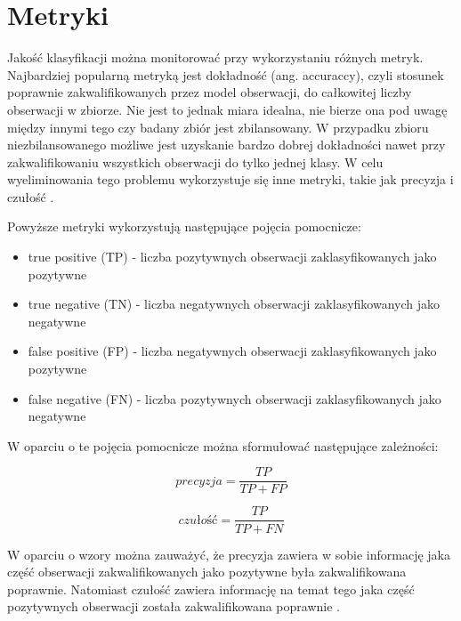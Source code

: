 \newpage %
\section{Metryki}

Jakość klasyfikacji można monitorować przy wykorzystaniu różnych metryk. Najbardziej popularną metryką jest dokładność (ang. accuraccy), czyli stosunek poprawnie zakwalifikowanych przez model obserwacji, do całkowitej liczby obserwacji w zbiorze. Nie jest to jednak miara idealna, nie bierze ona pod uwagę między innymi tego czy badany zbiór jest zbilansowany. W przypadku zbioru niezbilansowanego możliwe jest uzyskanie bardzo dobrej dokładności nawet przy zakwalifikowaniu wszystkich obserwacji do tylko jednej klasy. W celu wyeliminowania tego problemu wykorzystuje się inne metryki, takie jak precyzja i czułość \cite{metryki_3}.



Powyższe metryki wykorzystują następujące pojęcia pomocnicze:
\begin{itemize}
    \item true positive (TP) - liczba pozytywnych obserwacji zaklasyfikowanych jako pozytywne
    \item true negative (TN) - liczba negatywnych obserwacji zaklasyfikowanych jako negatywne
    \item false positive (FP) - liczba negatywnych obserwacji zaklasyfikowanych jako pozytywne
    \item false negative (FN) - liczba pozytywnych obserwacji zaklasyfikowanych jako negatywne
\end{itemize}


W oparciu o te pojęcia pomocnicze można sformułować następujące zależności:


$$
    precyzja = \frac{TP}{TP + FP}
$$

$$
    czułość = \frac{TP}{TP + FN}
$$





W oparciu o wzory można zauważyć, że precyzja zawiera w sobie informację jaka część obserwacji zakwalifikowanych jako pozytywne była zakwalifikowana poprawnie. Natomiast czułość zawiera informację na temat tego jaka część pozytywnych obserwacji została zakwalifikowana poprawnie \cite{metryki_1}.

